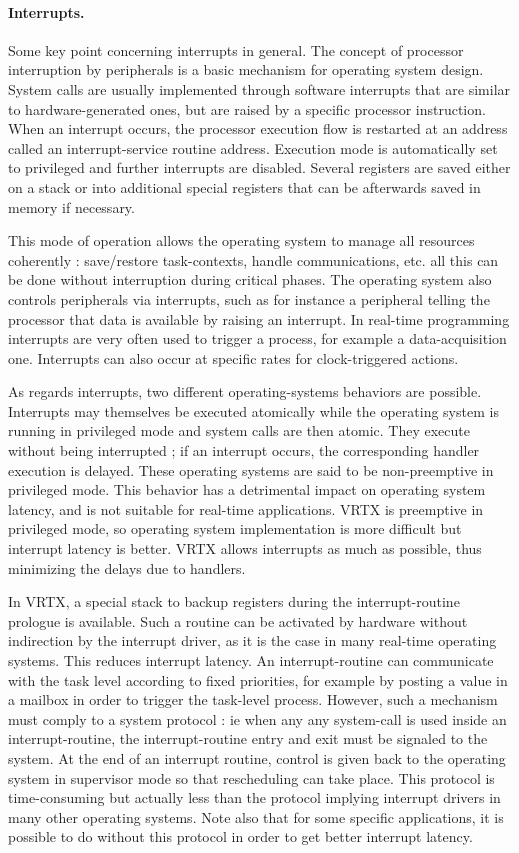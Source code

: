 \documentclass[10pt]{report}
\begin{document}
\paragraph{Interrupts.} Some key point concerning interrupts in general. The concept of
processor interruption by peripherals is a basic mechanism for
operating system design. System calls are usually implemented
through software interrupts that are similar to
hardware-generated ones, but are raised by a specific processor
instruction. When an interrupt occurs, the processor execution
flow is restarted at an address called an interrupt-service
routine address. Execution mode is automatically set to
privileged and further interrupts are disabled. Several registers
are saved either on a stack or into additional special registers
that can be afterwards saved in memory if necessary.

This mode of operation allows the operating system to manage all
resources coherently : save/restore task-contexts, handle
communications, etc. all this can be done without interruption
during critical phases. The operating system also controls
peripherals via interrupts, such as for instance a peripheral
telling the processor that data is available by raising an
interrupt. In real-time programming interrupts are very often
used to trigger a process, for example a data-acquisition one.
Interrupts can also occur at specific rates for clock-triggered
actions.

As regards interrupts, two different operating-systems behaviors
are possible. Interrupts may themselves be executed atomically while
the operating system is running in privileged mode and system
calls are then atomic. They execute without being interrupted ;
if an interrupt occurs, the corresponding handler execution is
delayed. These operating systems are said to be non-preemptive in
privileged mode. This behavior has a detrimental impact on
operating system latency, and is not suitable for real-time
applications. VRTX is preemptive in privileged mode, so operating
system implementation is more difficult but interrupt latency is
better. VRTX allows interrupts as much as possible, thus minimizing 
the delays due to handlers.

In VRTX, a special stack to backup registers during the 
interrupt-routine prologue is available. Such a routine can be
activated by hardware without indirection by the interrupt
driver, as it is the case in many real-time operating systems.
This reduces interrupt latency. An interrupt-routine can
communicate with the task level according to fixed priorities,
for example by posting a value in a mailbox in order to trigger the
task-level process. However, such a mechanism must comply to a
system protocol : ie when any any system-call is used inside an
interrupt-routine, the interrupt-routine entry and exit must be
signaled to the system. At the end of an interrupt routine, control
is given back to the operating system in supervisor mode so that
rescheduling can take place. This protocol is time-consuming but
actually less than the protocol implying interrupt drivers in
many other operating systems. Note also that for some specific
applications, it is possible to do without this protocol in order
to get better interrupt latency.
\end{document}
